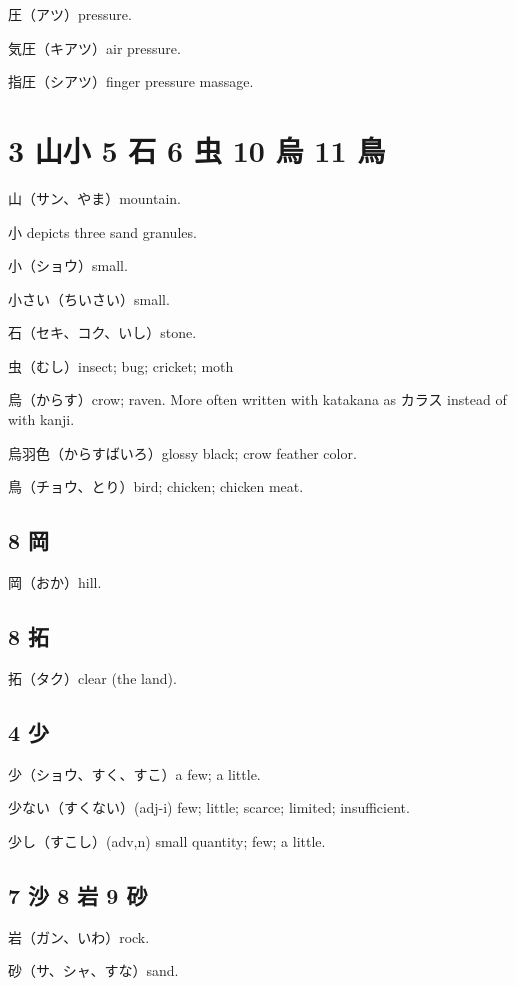 圧（アツ）pressure.

気圧（キアツ）air pressure.

指圧（シアツ）finger pressure massage.

\section{3 山小 5 石 6 虫 10 烏 11 鳥}

山（サン、やま）mountain.

小 depicts three sand granules.

小（ショウ）small.

小さい（ちいさい）small.

石（セキ、コク、いし）stone.

虫（むし）insect; bug; cricket; moth

烏（からす）crow; raven.
More often written with katakana as カラス instead of with kanji.

烏羽色（からすばいろ）glossy black; crow feather color.

鳥（チョウ、とり）bird; chicken; chicken meat.

\subsection{8 岡}

岡（おか）hill.

\subsection{8 拓}

拓（タク）clear (the land).

\subsection{4 少}

少（ショウ、すく、すこ）a few; a little.

少ない（すくない）(adj-i) few; little; scarce; limited; insufficient.

少し（すこし）(adv,n) small quantity; few; a little.

\subsection{7 沙 8 岩 9 砂}

岩（ガン、いわ）rock.

砂（サ、シャ、すな）sand.

